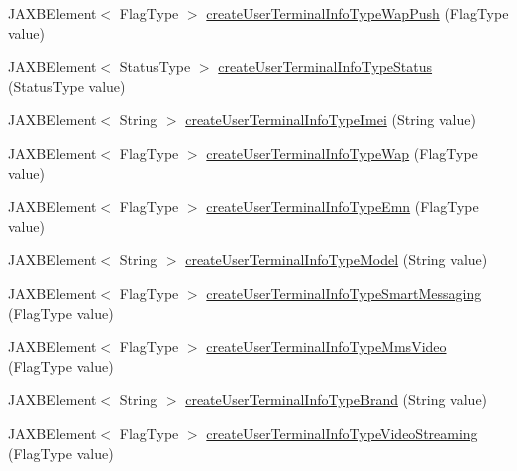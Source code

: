 \begin{DoxyCompactItemize}
\item 
JAXBElement$<$ FlagType $>$ \hyperlink{classcom_1_1telefonica_1_1schemas_1_1unica_1_1rest_1_1directory_1_1v1_1_1ObjectFactory_ad14cff5250492fe0b6b4b37526fbf891}{createUserTerminalInfoTypeWapPush} (FlagType value)
\item 
JAXBElement$<$ StatusType $>$ \hyperlink{classcom_1_1telefonica_1_1schemas_1_1unica_1_1rest_1_1directory_1_1v1_1_1ObjectFactory_a43e4b113a854b539b32a3d40b8f0f652}{createUserTerminalInfoTypeStatus} (StatusType value)
\item 
JAXBElement$<$ String $>$ \hyperlink{classcom_1_1telefonica_1_1schemas_1_1unica_1_1rest_1_1directory_1_1v1_1_1ObjectFactory_aa9a401cc171fc88be6c5c03be206456a}{createUserTerminalInfoTypeImei} (String value)
\item 
JAXBElement$<$ FlagType $>$ \hyperlink{classcom_1_1telefonica_1_1schemas_1_1unica_1_1rest_1_1directory_1_1v1_1_1ObjectFactory_ad5128aa0470d105535e887380804e4e1}{createUserTerminalInfoTypeWap} (FlagType value)
\item 
JAXBElement$<$ FlagType $>$ \hyperlink{classcom_1_1telefonica_1_1schemas_1_1unica_1_1rest_1_1directory_1_1v1_1_1ObjectFactory_a1f3f6191ae8abad0125740997f073fea}{createUserTerminalInfoTypeEmn} (FlagType value)
\item 
JAXBElement$<$ String $>$ \hyperlink{classcom_1_1telefonica_1_1schemas_1_1unica_1_1rest_1_1directory_1_1v1_1_1ObjectFactory_af53d8ff530a67f70ec7a003dbb1de723}{createUserTerminalInfoTypeModel} (String value)
\item 
JAXBElement$<$ FlagType $>$ \hyperlink{classcom_1_1telefonica_1_1schemas_1_1unica_1_1rest_1_1directory_1_1v1_1_1ObjectFactory_abd165350bc8da66dcd9c5ba4b966cb31}{createUserTerminalInfoTypeSmartMessaging} (FlagType value)
\item 
JAXBElement$<$ FlagType $>$ \hyperlink{classcom_1_1telefonica_1_1schemas_1_1unica_1_1rest_1_1directory_1_1v1_1_1ObjectFactory_ab9f41193f74e25898f0910c82e577d53}{createUserTerminalInfoTypeMmsVideo} (FlagType value)
\item 
JAXBElement$<$ String $>$ \hyperlink{classcom_1_1telefonica_1_1schemas_1_1unica_1_1rest_1_1directory_1_1v1_1_1ObjectFactory_a51ee5626fa6e4d0c2894fc04d96bb63a}{createUserTerminalInfoTypeBrand} (String value)
\item 
JAXBElement$<$ FlagType $>$ \hyperlink{classcom_1_1telefonica_1_1schemas_1_1unica_1_1rest_1_1directory_1_1v1_1_1ObjectFactory_a38dc045158cf1292509eeffeb56d15fa}{createUserTerminalInfoTypeVideoStreaming} (FlagType value)
\item 

\end{DoxyCompactItemize}
